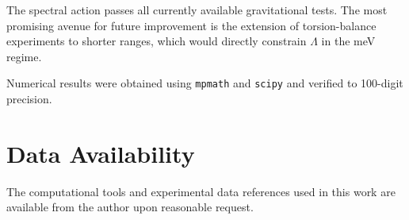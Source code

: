 \documentclass[aps,prd,twocolumn,superscriptaddress,nofootinbib,floatfix]{revtex4-2}
\begin{document}
The spectral action passes all currently available gravitational tests.
The most promising avenue for future improvement is the extension of
torsion-balance experiments to shorter ranges, which would directly
constrain $\Lambda$ in the meV regime.


\begin{acknowledgments}
Numerical results were obtained using \texttt{mpmath} and
\texttt{scipy} and verified to 100-digit precision.
\end{acknowledgments}

\section*{Data Availability}
The computational tools and experimental data references used in this
work are available from the author upon reasonable request.


\end{document}
